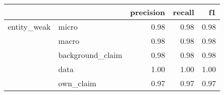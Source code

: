 \begin{tabular}{llrrr}
\toprule
            &           &  precision &  recall &   f1 \\
\midrule
entity\_weak & micro &       0.98 &    0.98 & 0.98 \\
            & macro &       0.98 &    0.98 & 0.98 \\
            & background\_claim &       0.98 &    0.98 & 0.98 \\
            & data &       1.00 &    1.00 & 1.00 \\
            & own\_claim &       0.97 &    0.97 & 0.97 \\
\bottomrule
\end{tabular}
